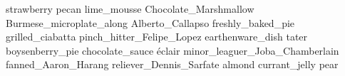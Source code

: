 strawberry pecan lime\_mousse Chocolate\_Marshmallow Burmese\_microplate\_along Alberto\_Callapso freshly\_baked\_pie grilled\_ciabatta pinch\_hitter\_Felipe\_Lopez earthenware\_dish tater boysenberry\_pie chocolate\_sauce éclair minor\_leaguer\_Joba\_Chamberlain fanned\_Aaron\_Harang reliever\_Dennis\_Sarfate almond currant\_jelly pear 
